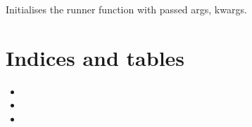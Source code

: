 \documentclass[letterpaper,10pt,english]{sphinxmanual}
\begin{document}
\begin{fulllineitems}
\begin{fulllineitems}
\begin{quote}
\begin{description}
\begin{itemize}
\end{itemize}

\end{description}\end{quote}

\end{fulllineitems}


\begin{fulllineitems}
\label{\detokenize{gui_worker:src.graphical_user_interface.worker.Worker.run}}
\sphinxAtStartPar
Initialises the runner function with passed args, kwargs.

\end{fulllineitems}


\end{fulllineitems}



\chapter{Indices and tables}
\label{\detokenize{index:indices-and-tables}}\begin{itemize}
\item {} 
\sphinxAtStartPar
{}

\item {} 
\sphinxAtStartPar
{}

\item {} 
\sphinxAtStartPar
{}

\end{itemize}
\end{document}
